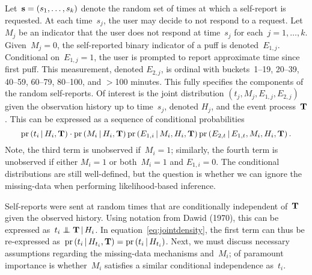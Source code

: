 \documentclass[11pt]{amsart}
\def\pr{\mathop{\text{pr}}\nolimits}
\def\pr{\mathop{\text{pr}}\nolimits}
\def\indep{\mathrel{\rlap{$\perp$}\kern1.6pt\mathord{\perp}}}
\def\given{\, | \,}
\def\bfs{{\bf s}}
\def\bfT{{\bf T}}
\begin{document}
Let~$\bfs = (s_{1}, \ldots, s_{k})$ denote the random set of times at
which a self-report is requested.  
At each time~$s_j$, the user may decide to not respond to a request. 
Let~$M_{j}$ be an indicator that the user does not respond at
time~$s_j$ for each~$j=1,\ldots,k$.
Given~$M_{j} = 0$, the self-reported binary indicator of a puff is
denoted~$E_{1,j}$.  Conditional on~$E_{1,j} = 1$, the user is prompted 
to report approximate time since first puff. This measurement, denoted
$E_{2, j}$, is ordinal with buckets~1--19, 20--39, 40--59, 60--79,
80--100, and $>$100 minutes.  This fully specifies the components of
the random self-reports. Of interest is the joint distribution $(t_j,
M_{j}, E_{1, j}, E_{2, j})$ given the observation history up to
time~$s_j$, denoted $H_{j}$, and the event process~$\bfT$.  This can
be expressed as a sequence of conditional probabilities
\begin{equation}
  \label{eq:jointdensity}
  \pr \left( t_i \given H_{i}, \bfT \right) \cdot \pr \left( M_{i}
    \given H_{i}, \bfT \right) \pr \left( E_{1,i} \given M_{i}, H_{i},
  \bfT \right) \pr \left(E_{2,t} \given E_{1,t}, M_{i}, H_{i}, \bfT \right).
\end{equation} 
Note, the third term is unobserved if~$M_{i} = 1$; similarly, the
fourth term is unobserved if either $M_{i}=1$ or both~$M_{i}=1$
and $E_{1,i} = 0$.  The conditional distributions are still
well-defined, but the question is whether we can ignore the
missing-data when performing likelihood-based inference.

Self-reports were sent at random times that are conditionally
independent of~$\bfT$ given the observed history. Using notation from
Dawid (1970), this can be expressed as~$t_i \indep \bfT \given
H_{i}$.  In equation~\eqref{eq:jointdensity}, the first term can thus
be re-expressed as~$\pr \left( t_i \given H_{t_i}, \bfT \right) = \pr
\left( t_i \given H_{t_i} \right)$. 
Next, we must discuss necessary assumptions regarding the missing-data
mechanisms and~$M_{i}$; of paramount importance is whether~$M_{i}$
satisfies a similar conditional independence as~$t_i$.  
\end{document}
